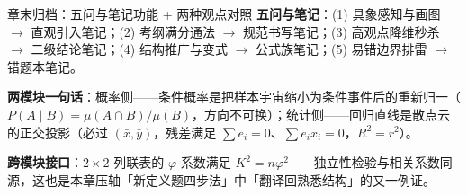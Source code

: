 
\begin{notezone}{章末归档：五问与笔记功能 + 两种观点对照}
\textbf{五问与笔记}：(1) 具象感知与画图 $\to$ 直观引入笔记；(2) 考纲满分通法 $\to$ 规范书写笔记；(3) 高观点降维秒杀 $\to$ 二级结论笔记；(4) 结构推广与变式 $\to$ 公式族笔记；(5) 易错边界排雷 $\to$ 错题本笔记。

\textbf{两模块一句话}：概率侧——条件概率是把样本宇宙缩小为条件事件后的重新归一（$P(A\mid B)=\mu(A\cap B)/\mu(B)$，方向不可换）；统计侧——回归直线是散点云的正交投影（必过 $(\bar x,\bar y)$，残差满足 $\sum e_i=0$、$\sum e_ix_i=0$，$R^2=r^2$）。

\textbf{跨模块接口}：$2\times2$ 列联表的 $\varphi$ 系数满足 $K^2=n\varphi^2$——独立性检验与相关系数同源，这也是本章压轴「新定义题四步法」中「翻译回熟悉结构」的又一例证。
\end{notezone}
